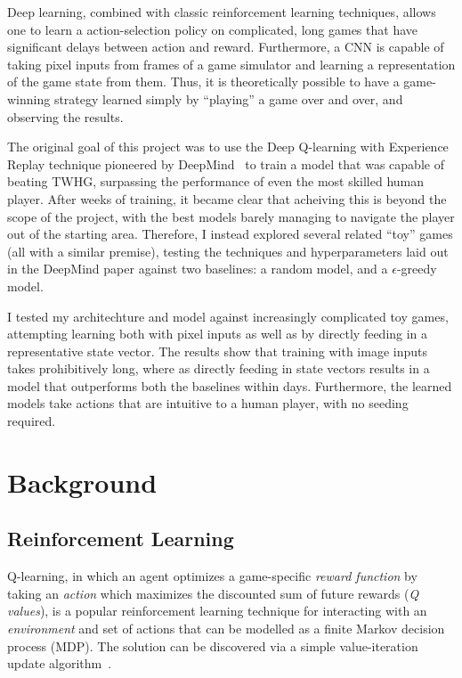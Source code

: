 \documentclass[12pt]{article}
\begin{document}
Deep learning, combined with classic reinforcement learning techniques, allows one to learn a action-selection policy on complicated, long games that have significant delays between action and reward. Furthermore, a CNN is capable of taking pixel inputs from frames of a game simulator and learning a representation of the game state from them. Thus, it is theoretically possible to have a game-winning strategy learned simply by ``playing'' a game over and over, and observing the results.

The original goal of this project was to use the Deep Q-learning with Experience Replay technique pioneered by DeepMind~\cite{deepmind} to train a model that was capable of beating TWHG, surpassing the performance of even the most skilled human player. After weeks of training, it became clear that acheiving this is beyond the scope of the project, with the best models barely managing to navigate the player out of the starting area. Therefore, I instead explored several related ``toy'' games (all with a similar premise), testing the techniques and hyperparameters laid out in the DeepMind paper against two baselines: a random model, and a $\epsilon$-greedy model.

I tested my architechture and model against increasingly complicated toy games, attempting learning both with pixel inputs as well as by directly feeding in a representative state vector. The results show that training with image inputs takes prohibitively long, where as directly feeding in state vectors results in a model that outperforms both the baselines within days. Furthermore, the learned models take actions that are intuitive to a human player, with no seeding required.

\section{Background}

\subsection{Reinforcement Learning}

Q-learning, in which an agent optimizes a game-specific \textit{reward function} by taking an \textit{action} which maximizes the discounted sum of future rewards (\textit{Q values}), is a popular reinforcement learning technique for interacting with an \textit{environment} and set of actions that can be modelled as a finite Markov decision process (MDP). The solution can be discovered via a simple value-iteration update algorithm~\cite{Watkins1992}.
\end{document}
